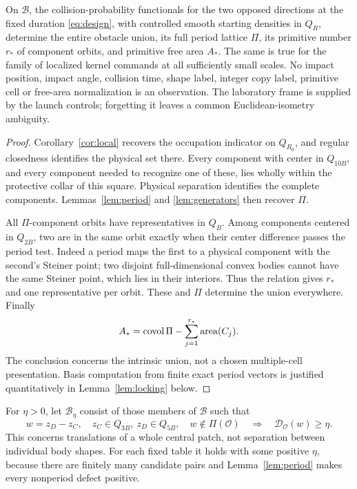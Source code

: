 \begin{theorem}
\label{thm:global-exact}
On $\mathcal B$, the collision-probability functionals for the two
opposed directions at the fixed duration \eqref{eq:design}, with
controlled smooth starting densities in $Q_R$, determine the entire
obstacle union, its full period lattice $\Pi$, its primitive number
$r_*$ of component orbits, and primitive free area $A_*$. The same is
true for the family of localized kernel commands at all sufficiently
small scales. No impact position, impact angle, collision time, shape
label, integer copy label, primitive cell or free-area normalization
is an observation. The laboratory frame is supplied by the launch
controls; forgetting it leaves a common Euclidean-isometry ambiguity.
\end{theorem}
\begin{proof}
Corollary~\ref{cor:local} recovers the occupation indicator on
$Q_{R_0}$, and regular closedness identifies the physical set there.
Every component with center in $Q_{10B}$, and every component needed
to recognize one of these, lies wholly within the protective collar
of this square. Physical separation identifies the complete components.
Lemmas~\ref{lem:period} and \ref{lem:generators} then recover $\Pi$.

All $\Pi$-component orbits have representatives in $Q_B$. Among
components centered in $Q_{2B}$, two are in the same orbit exactly when
their center difference passes the period test. Indeed a period maps
the first to a physical component with the second's Steiner point;
two disjoint full-dimensional convex bodies cannot have the same
Steiner point, which lies in their interiors. Thus the relation gives
$r_*$ and one representative per orbit. These and $\Pi$ determine the
union everywhere. Finally
\begin{equation}\label{eq:area}
 A_*=\operatorname{covol}\Pi-\sum_{j=1}^{r_*}\operatorname{area}(C_j).
\end{equation}
The conclusion concerns the intrinsic union, not a chosen multiple-cell
presentation. Basis computation from finite exact period vectors is
justified quantitatively in Lemma~\ref{lem:locking} below.
\end{proof}

\begin{definition}\label{def:margin}
For $\eta>0$, let $\mathcal B_\eta$ consist of those members of
$\mathcal B$ such that
\begin{equation}\label{eq:margin}
 w=z_D-z_C,\quad z_C\in Q_{3B},\ z_D\in Q_{5B},\quad
 w\notin\Pi(\mathcal O)\quad\Longrightarrow\quad
                  \mathcal D_{\mathcal O}(w)\ge\eta.
\end{equation}
This concerns translations of a whole central patch, not separation
between individual body shapes. For each fixed table it holds with some
positive $\eta$, because there are finitely many candidate pairs and
Lemma~\ref{lem:period} makes every nonperiod defect positive.
\end{definition}

